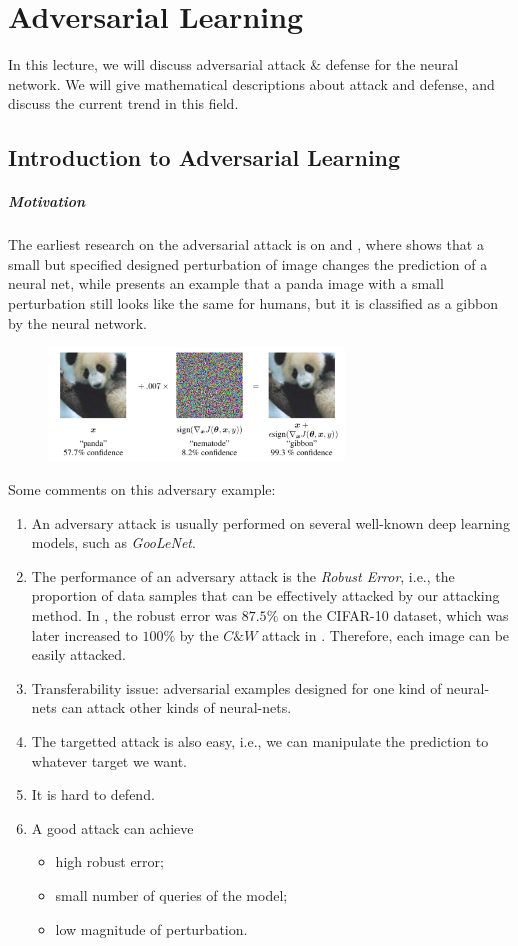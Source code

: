 \chapter{Adversarial Learning}
In this lecture, we will discuss adversarial attack $\&$ defense for the neural network. 
We will give mathematical descriptions about attack and defense, and discuss the current trend in this field. 
\section{Introduction to Adversarial Learning}
\paragraph{Motivation}
The earliest research on the adversarial attack is on \citep{43405} and \citep{42503}, where \citep{42503} shows that a small but specified designed perturbation of image changes the prediction of a neural net,
while \citep{43405} presents an example that a panda image with a small perturbation still looks like the same for humans, but it is classified as a gibbon by the neural network.
\begin{figure}[H]
\centering
\includegraphics[width=0.7\textwidth]{Eigth_lecture/f_2}
\end{figure}
\begin{remark}
Some comments on this adversary example:
\begin{enumerate}
\item
An adversary attack is usually performed on several well-known deep learning models, such as \emph{GooLeNet}.
\item
The performance of an adversary attack is the \emph{Robust Error}, i.e., the proportion of data samples that can be effectively attacked by our attacking method.
In \citep{43405}, the robust error was $87.5\%$ on the CIFAR-10 dataset, which was later increased to $100\%$ by the $C\& W$ attack in \citep{7958570}.
Therefore, each image can be easily attacked.
\item
Transferability issue: adversarial examples designed for one kind of neural-nets can attack other kinds of neural-nets.
\item
The targetted attack is also easy, i.e., we can manipulate the prediction to whatever target we want.
\item
It is hard to defend.
\item
A good attack can achieve
\begin{itemize}
\item
high robust error;
\item
small number of queries of the model;
\item
low magnitude of perturbation.
\end{itemize}
\end{enumerate}
\end{remark}

